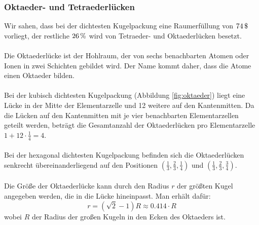\documentclass[a4paper,titlepage]{scrartcl}
\numberwithin{equation}{section}
\begin{document}
\subsubsection{Oktaeder- und Tetraederlücken}
Wir sahen, dass bei der dichtesten Kugelpackung eine Raumerfüllung von $\unit[74]{\$}$ vorliegt, der restliche $\unit[26]{\%}$ wird von Tetraeder- und Oktaederlücken besetzt.\\ \\
Die Oktaederlücke ist der Hohlraum, der von sechs benachbarten Atomen oder Ionen in zwei Schichten gebildet wird.  Der Name kommt daher, dass die Atome einen Oktaeder bilden.\\ \\
Bei der kubisch dichtesten Kugelpackung (Abbildung \ref{fig:oktaeder}) liegt eine Lücke in der Mitte der Elementarzelle und 12 weitere auf den Kantenmitten. Da die Lücken auf den Kantenmitten mit je vier benachbarten Elementarzellen geteilt werden, beträgt die Gesamtanzahl der Oktaederlücken pro Elementarzelle $1 + 12 \cdot \frac{1}{4}=4$.\\ \\
Bei der hexagonal dichtesten Kugelpackung befinden sich die Oktaederlücken senkrecht übereinanderliegend auf den Positionen $(\frac{1}{3},\frac{2}{3},\frac{1}{4})$ und $(\frac{1}{3},\frac{2}{3},\frac{3}{4})$.\\ \\
Die Größe der Oktaederlücke kann durch den Radius $r$ der größten Kugel angegeben werden, die in die Lücke hineinpasst. Man erhält dafür:
\begin{equation*}
r=(\sqrt{2}-1)R\approx 0.414 \cdot R
\end{equation*}
wobei $R$ der Radius der großen Kugeln in den Ecken des Oktaeders ist.
\end{document}
